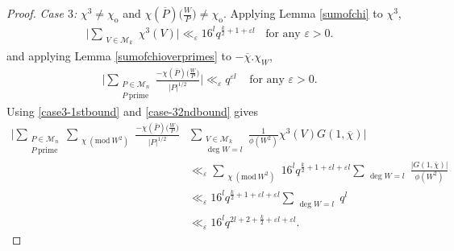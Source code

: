 \documentclass[10pt,a4paper]{amsart}
\newcommand{\CM}{\mathcal{M}}
\newcommand{\Mod}[1]{\ (\mathrm{mod}\ #1)}
\begin{document}
\begin{proof}
\textit{Case $3$:} $\chi^{3} \neq \chi_{\mathrm{o}}$ and $\chi(\overline{P}) \Big (\frac{W}{P} \Big ) \neq \chi_{\mathrm{o}}$. Applying Lemma \ref{sumofchi} to $\chi^3$, 
\begin{align}\label{case3-1stbound}
\Big | \sum_{\substack{V \in \mathcal{M}_k}} \chi^3(V) \Big | \ll_{\varepsilon} 16^l q^{\frac{k}{2} + 1 +\varepsilon l } \ \ \ \ \text{for any $\varepsilon > 0 $}.
\end{align}
and applying Lemma \ref{sumofchioverprimes} to $-\overline{\chi}.\chi_{W}$,
\begin{align}\label{case-32ndbound}
    \Big | \sum_{\substack{P \in \CM_{n} \\ P \ \text{prime} }} \frac{-\chi(\overline{P}) \Big (\frac{W}{P} \Big )}{|P|^{1/2}} \Big | \ll_{\varepsilon} q^{\varepsilon l} \ \ \ \ \ \text{for any $\varepsilon > 0$}.
\end{align}
Using \eqref{case3-1stbound} and \eqref{case-32ndbound} gives 
\begin{align*}
\Big | \sum_{\substack{P \in \CM_{n} \\ P \ \text{prime} }}  \sum_{\substack{\chi \Mod{ W^2}}} \frac{-\chi(\overline{P}) \Big (\frac{W}{P} \Big )}{|P|^{1/2}}  &\sum_{\substack{V \in \mathcal{M}_k \\ \deg W =l}} \frac{1}{\phi(W^2)} \chi^3(V) G(1,\overline{\chi}) \Big | \\ & \ll_{\varepsilon}  \sum_{\substack{\chi \Mod{ W^2}}} 16^{l} q^{\frac{k}{2}+ 1+\varepsilon l +\varepsilon l } \sum_{\substack{\deg W =l}}\frac{|G(1,\overline{\chi})|}{\phi(W^2)}
\\
& \ll_{\varepsilon} 16^{l} q^{\frac{k}{2}+ 1+ \varepsilon l + \varepsilon l } \sum_{\substack{\deg W =l}} q^l
\\
& \ll_{\varepsilon} 16^{l} q^{2l+2+ \frac{k}{2}+ \varepsilon l +\varepsilon l}.
\end{align*}

\end{proof}
\end{document}
